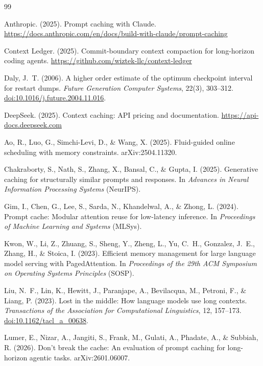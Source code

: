 \documentclass[11pt]{article}
\theoremstyle{definition}
\theoremstyle{remark}
\begin{document}
\begin{thebibliography}{99}

Anthropic. (2025).
Prompt caching with Claude.
\url{https://docs.anthropic.com/en/docs/build-with-claude/prompt-caching}

Context Ledger. (2025).
Commit-boundary context compaction for long-horizon coding agents.
\url{https://github.com/wiztek-llc/context-ledger}

Daly, J.~T. (2006).
A higher order estimate of the optimum checkpoint interval for restart dumps.
\emph{Future Generation Computer Systems}, 22(3), 303--312.
\href{https://doi.org/10.1016/j.future.2004.11.016}{doi:10.1016/j.future.2004.11.016}.

DeepSeek. (2025).
Context caching: API pricing and documentation.
\url{https://api-docs.deepseek.com}

Ao, R., Luo, G., Simchi-Levi, D., \& Wang, X. (2025).
Fluid-guided online scheduling with memory constraints.
arXiv:2504.11320.

Chakraborty, S., Nath, S., Zhang, X., Bansal, C., \& Gupta, I. (2025).
Generative caching for structurally similar prompts and responses.
In \emph{Advances in Neural Information Processing Systems} (NeurIPS).

Gim, I., Chen, G., Lee, S., Sarda, N., Khandelwal, A., \& Zhong, L. (2024).
Prompt cache: Modular attention reuse for low-latency inference.
In \emph{Proceedings of Machine Learning and Systems} (MLSys).

Kwon, W., Li, Z., Zhuang, S., Sheng, Y., Zheng, L., Yu, C.~H., Gonzalez, J.~E., Zhang, H., \& Stoica, I. (2023).
Efficient memory management for large language model serving with PagedAttention.
In \emph{Proceedings of the 29th ACM Symposium on Operating Systems Principles} (SOSP).

Liu, N.~F., Lin, K., Hewitt, J., Paranjape, A., Bevilacqua, M., Petroni, F., \& Liang, P. (2023).
Lost in the middle: How language models use long contexts.
\emph{Transactions of the Association for Computational Linguistics}, 12, 157--173.
\href{https://doi.org/10.1162/tacl_a_00638}{doi:10.1162/tacl\_a\_00638}.

Lumer, E., Nizar, A., Jangiti, S., Frank, M., Gulati, A., Phadate, A., \& Subbiah, R. (2026).
Don't break the cache: An evaluation of prompt caching for long-horizon agentic tasks.
arXiv:2601.06007.


\end{thebibliography}
\end{document}
